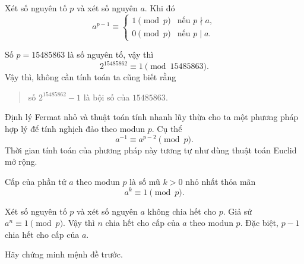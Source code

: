 \begin{frame}
  \begin{thrm}
    Xét số nguyên tố $p$ và xét số nguyên $a$. Khi đó 
    $$
    a^{p-1} \equiv
    \begin{cases}
      1 \pmod{p} &\text{nếu } p \nmid a, \\
      0 \pmod{p} &\text{nếu } p \mid a.
    \end{cases}
    $$
  \end{thrm}
\end{frame}

\begin{frame}
  \begin{xmpl}
    Số $p = 15485863$ là số nguyên tố, vậy thì 
    $$
    2^{15485862} \equiv 1 \pmod{15485863}.
    $$
Vậy thì, không cần tính toán ta cũng biết rằng 
\begin{quote}
  số $2^{15485862} - 1$ là bội số của $15485863$.
\end{quote}
  \end{xmpl}
\end{frame}

\begin{frame}
  \begin{rmrk}
    Định lý Fermat nhỏ và thuật toán tính nhanh lũy thừa cho ta một phương pháp hợp lý để tính nghịch đảo theo modun $p$. Cụ thể
    $$
    a^{-1}\equiv a^{p-2} \pmod {p}.
    $$
    Thời gian tính toán của phương pháp này tương tự như dùng thuật toán Euclid mở rộng.
  \end{rmrk}
\end{frame}
\begin{frame}
  \begin{dfntn}
    \alert{Cấp của phần tử $a$ theo modun $p$} là số mũ $k > 0$ nhỏ nhất thỏa mãn 
    $$
    a^k \equiv 1 \pmod{p}.
    $$ 
  \end{dfntn}
  \begin{prpstn}
    Xét số nguyên tố $p$ và xét số nguyên $a$ không chia hết cho $p$. Giả sử $a^n\equiv 1 \pmod{p}$. Vậy thì $n$ chia hết cho cấp của $a$ theo modun $p$. Đặc biệt, $p-1$ chia hết cho cấp của $a$.
  \end{prpstn}
\end{frame}

\begin{frame}
  \begin{xrcs}
    Hãy chứng minh mệnh đề trước.
  \end{xrcs}
\end{frame}

